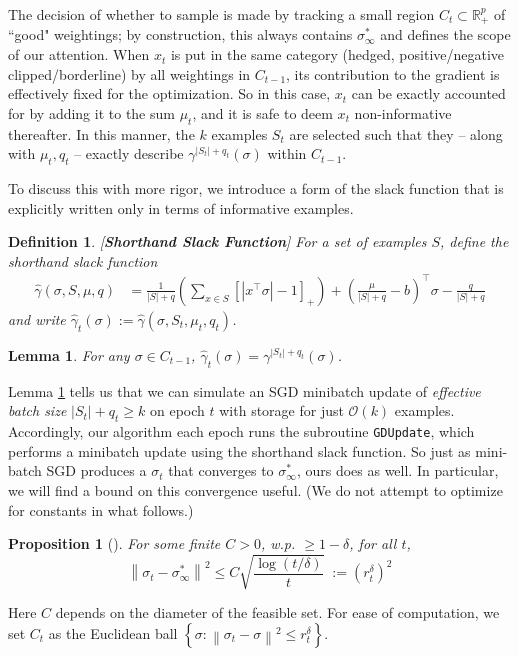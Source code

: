 \documentclass{colt2015} %
\newtheorem{lem}[thm]{Lemma}
\newtheorem{prop}[thm]{Proposition}
\newtheorem{defn}[thm]{Definition}
\newcommand{\RR}{\mathbb{R}}      %
\newcommand{\vnorm}[1]{\left\lVert#1\right\rVert} %
\newcommand{\abs}[1]{\left| #1 \right|}
\newcommand{\gamhat}{\hat{\gamma}}
\newcommand{\cO}{\mathcal{O}}
\newcommand{\lrp}[1]{\left(#1\right)}
\newcommand{\lrsetb}[1]{\left\{#1\right\}}
\newcommand{\authcmt}[2]{\textcolor{#1}{}}
\newcommand{\akshay}[1]{\authcmt{red}{[AB: #1]}}
\begin{document}
The decision of whether to sample is made by tracking  
a small region $C_t \subset \RR_+^p$ of ``good" weightings; 
by construction, this always contains $\sigma_{\infty}^*$ and defines the scope of our attention. 
When $x_t$ is put in the same category (hedged, positive/negative clipped/borderline) 
by all weightings in $C_{t-1}$, 
its contribution to the gradient is effectively fixed for the optimization. 
So in this case, $x_t$ can be exactly accounted for by adding it to the sum $\mu_t$, 
and it is safe to deem $x_t$ non-informative thereafter. 
In this manner, the $k$ examples $S_t$ are selected 
such that they -- along with $\mu_t, q_t$ -- 
exactly describe $\gamma^{\abs{S_t} + q_t} (\sigma)$ within $C_{t-1}$.


To discuss this with more rigor, 
we introduce a form of the slack function that is explicitly written only in terms of informative examples. 
\begin{defn}
\label{def:approxslack}[\textbf{Shorthand Slack Function}]
For a set of examples $S$, define the \emph{shorthand slack function}
\begin{align*}
\gamhat (\sigma, S, \mu, q) 
&= \frac{1}{|S| + q} 
\lrp{ \sum_{x \in S} \left[ \abs{x^\top \sigma} - 1 \right]_{+} } 
+ \lrp{\frac{\mu}{|S| + q} - b}^\top \sigma - \frac{q}{|S| + q} 
\end{align*}
and write $\gamhat_t (\sigma) := \gamhat (\sigma, S_t, \mu_t, q_t)$.
\end{defn}
\begin{lem}
\label{lem:compressslack}
For any $\sigma \in C_{t-1}$, $\gamhat_t (\sigma) = \gamma^{|S_t| + q_t} (\sigma)$.
\end{lem}

Lemma \ref{lem:compressslack} tells us that we can simulate an SGD minibatch update 
of \emph{effective batch size} $|S_t| + q_t \geq k$ on epoch $t$ with storage for just $\cO(k)$ examples. 
Accordingly, our algorithm each epoch runs the subroutine \texttt{GDUpdate}, 
which performs a minibatch update using the shorthand slack function. 
So just as mini-batch SGD produces a $\sigma_t$ that converges to $\sigma_{\infty}^*$, 
ours does as well. 
In particular, we will find a bound on this convergence useful. 
(We do not attempt to optimize for constants in what follows.)
\begin{prop}[\cite{DGBSX12}]
\label{prop:sgdconvrate}
For some finite $C > 0$, w.p. $\geq 1-\delta$, for all $t$, 
$$ \vnorm{\sigma_t - \sigma_{\infty}^*}^2 \leq C \sqrt{\frac{\log (t/\delta)}{t}} \;:= (r_t^\delta)^2 $$ 
\end{prop}
\akshay{Find minibatch-size-dependent bound.}
Here $C$ depends on the diameter of the feasible set. 
For ease of computation, we set $C_t$ as the Euclidean ball $\lrsetb{ \sigma : \vnorm{\sigma_t - \sigma}^2 \leq r_t^\delta}$. 
\end{document}

